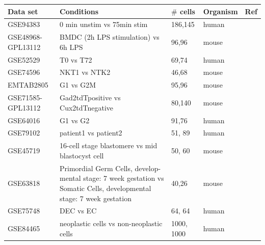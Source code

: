 \documentclass[aoas,preprint]{imsart}
\begin{document}
\begin{table}[b]
\tiny
\centering
\begin{tabular}{ |p{2cm}|p{5cm}|p{1.5cm}|p{1.5cm}|p{2cm}|}
\hline
 Data set & Conditions & $\#$ cells & Organism  & Ref \\ \hline \hline
GSE94383 & 0 min unstim vs 75min stim & 186,145 & human & \citep{Lane} \\ \hline
GSE48968-GPL13112 & BMDC (2h LPS stimulation) vs 6h LPS & 96,96 & mouse & \citep{Shalek} \\ \hline
GSE52529 & T0 vs T72 & 69,74 & human & \citep{Trapnell} \\ \hline
GSE74596 & NKT1 vs NTK2 & 46,68 & mouse & \citep{Engel} \\ \hline
EMTAB2805 & G1 vs G2M & 95,96 & mouse & \citep{EMTAB} \\ \hline
GSE71585-GPL13112 &Gad2tdTpositive vs Cux2tdTnegative  & 80,140 & mouse & \citep{Tasic} \\ \hline
GSE64016 & G1 vs G2 & 91,76 & human & \citep{oscope} \\ \hline
GSE79102 & patient1 vs patient2 & 51, 89 & human & \cite{sc3} \\ \hline
GSE45719 & 16-cell stage blastomere vs mid blastocyst cell & 50, 60 & mouse & \citep{Deng193} \\ \hline
GSE63818 & Primordial Germ Cells, develop- mental stage: 7 week gestation vs Somatic Cells, developmental stage: 7 week gestation & 40,26 & mouse & \citep{Guo} \\ \hline
GSE75748 & DEC vs EC & 64, 64 & human & \citep{chu} \\ \hline
GSE84465 & neoplastic cells vs non-neoplastic cells & 1000, 1000 & human & \citep{Darmanis} \\ \hline
\end{tabular}
\label{table:1}
\end{table}
\end{document}
